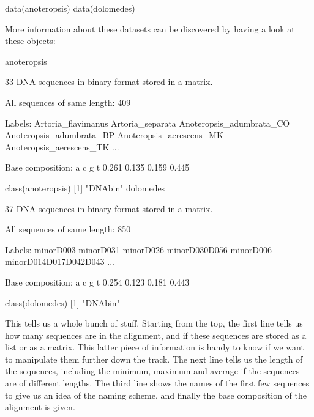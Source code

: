 \documentclass{article}
\begin{document}
\begin{console}
data(anoteropsis)
data(dolomedes)
\end{console}

More information about these datasets can be discovered by having a look at these objects: 

\begin{console}
anoteropsis
\end{console}

\begin{Routput}
33 DNA sequences in binary format stored in a matrix.

All sequences of same length: 409 

Labels: Artoria_flavimanus Artoria_separata Anoteropsis_adumbrata_CO 
Anoteropsis_adumbrata_BP Anoteropsis_aerescens_MK Anoteropsis_aerescens_TK ...

Base composition:
    a     c     g     t 
0.261 0.135 0.159 0.445
\end{Routput}

\begin{Rio}
class(anoteropsis)
[1] "DNAbin"
dolomedes
\end{Rio}

\begin{Routput}
37 DNA sequences in binary format stored in a matrix.

All sequences of same length: 850 

Labels: minorD003 minorD031 minorD026 minorD030D056 minorD006 
minorD014D017D042D043 ...

Base composition:
    a     c     g     t 
0.254 0.123 0.181 0.443
\end{Routput}

\begin{Rio}
class(dolomedes)
[1] "DNAbin"
\end{Rio}

This tells us a whole bunch of stuff. Starting from the top, the first line tells us how many sequences are in the alignment, and if these sequences are stored as a list or as a matrix. This latter piece of information is handy to know if we want to manipulate them further down the track. The next line tells us the length of the sequences, including the minimum, maximum and average if the sequences are of different lengths. The third line shows the names of the first few sequences to give us an idea of the naming scheme, and finally the base composition of the alignment is given.
\end{document}
